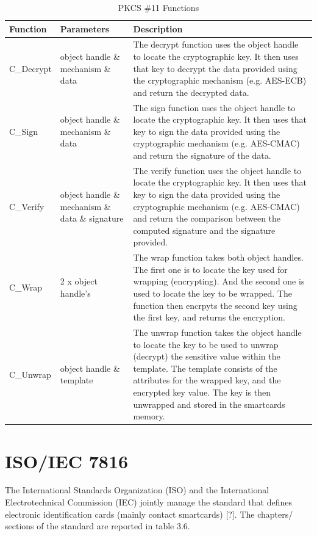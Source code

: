 \documentclass[bsc,frontabs,twoside,singlespacing,parskip,deptreport]{infthesis}     %
\begin{document}
\begin{table}[H]
\begin{tabular}{|l|p{5cm}|p{8cm}|}
\hline
Function & Parameters & Description\\
\hline
C\_Decrypt & object handle \& mechanism \& data & The decrypt function uses the object handle to locate the cryptographic key. It then uses that key to decrypt the data provided using the cryptographic mechanism (e.g. AES-ECB) and return the decrypted data. \\
\hline
C\_Sign & object handle \& mechanism \& data & The sign function uses the object handle to locate the cryptographic key. It then uses that key to sign the data provided using the cryptographic mechanism (e.g. AES-CMAC) and return the signature of the data. \\
\hline
C\_Verify & object handle \& mechanism \& data \& signature & The verify function uses the object handle to locate the cryptographic key. It then uses that key to sign the data provided using the cryptographic mechanism (e.g. AES-CMAC) and return the comparison between the computed signature and the signature provided. \\
\hline
C\_Wrap & 2 x object handle's &  The wrap function takes both object handles. The first one is to locate the key used for wrapping (encrypting). And the second one is used to locate the key to be wrapped. The function then encrpyts the second key using the first key, and returns the encryption. \\
\hline
C\_Unwrap & object handle \& template & The unwrap function takes the object handle to locate the key to be used to unwrap (decrypt) the sensitive value within the template. The template consists of the attributes for the wrapped key, and the encrypted key value. The key is then unwrapped and stored in the smartcards memory. \\
\hline
\end{tabular}
\caption{PKCS \#11 Functions}
\end{table}

\pagebreak
\section{ISO/IEC 7816}

The International Standards Organization (ISO) and the International Electrotechnical Commission (IEC) jointly manage the standard that defines electronic identification cards (mainly contact smartcards) [?].
The chapters/ sections of the standard are reported in table 3.6. 
 
\end{document}
